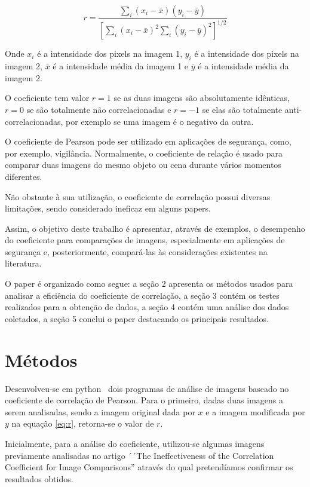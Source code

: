 \documentclass[10pt,a4paper]{article}
\begin{document}
\begin{equation}r = \frac{  
    \displaystyle{\sum_{i} (x_i-\bar{x})(y_i-  
      \bar{y})}}{\displaystyle{\left[  
        \sum_{i}(x_i-\bar{x})^2  
        \sum_{i}(y_i-\bar{y})^2\right]^{1/2}}}  \label{eq:r}
\end{equation}  

Onde $x_i$ é a intensidade dos pixels na imagem 1, $y_i$ é a
intensidade dos pixels na imagem 2, $\bar{x}$ é a intensidade média da
imagem 1 e $\bar{y}$ é a intensidade média da imagem 2.

O coeficiente tem valor $r=1$ se as duas imagens são absolutamente
idênticas, $r=0$ se são totalmente não correlacionadas e $r=-1$ se elas
são totalmente anti-correlacionadas, por exemplo se uma imagem é o
negativo da outra.

O coeficiente de Pearson pode ser utilizado em
aplicações de segurança, como, por exemplo, vigilância. Normalmente, 
o coeficiente de relação é usado para comparar duas imagens do mesmo
objeto ou cena durante vários momentos diferentes.

Não obstante à sua utilização, o coeficiente de correlação possui
diversas limitações, sendo considerado ineficaz em alguns papers.%

Assim, o objetivo deste trabalho é apresentar, através de exemplos, o
desempenho do coeficiente para comparações de imagens, especialmente
em aplicações de segurança e, posteriormente, compará-las às considerações existentes na literatura.

 O paper é organizado como segue: a seção 2 apresenta os métodos usados para
 analisar a eficiência do coeficiente de correlação, a seção 3 contém
 os testes realizados para a obtenção de dados, a seção 4 contém uma
 análise dos dados coletados, a seção 5 conclui o paper destacando os principais resultados. 
\section{Métodos}

Desenvolveu-se em python~\cite{python} dois programas de análise de imagens baseado no
coeficiente de correlação de Pearson. Para o primeiro, dadas duas imagens a serem analisadas, sendo a imagem original dada por $x$  e a
imagem modificada por $y$ na equação \eqref{eq:r}, retorna-se o valor de $r$.

Inicialmente, para a análise do coeficiente, utilizou-se algumas imagens
previamente analisadas no artigo ´´The Ineffectiveness of the Correlation
Coefficient for Image Comparisons'' através do qual pretendíamos
confirmar os resultados obtidos.
\end{document}
